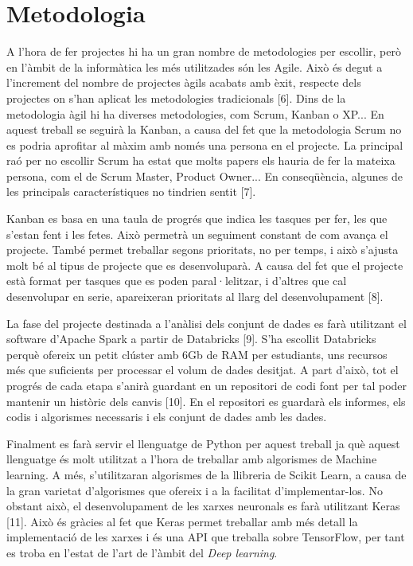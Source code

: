 \documentclass[10pt,a4paper,twocolumn,twoside]{article}
\begin{document}
\section {Metodologia}
A l'hora de fer projectes hi ha un gran nombre de metodologies per escollir, però en l'àmbit de la informàtica les més utilitzades són les Agile. Això és degut a l'increment del nombre de projectes àgils acabats amb èxit, respecte dels projectes on s'han aplicat les metodologies tradicionals [6]. Dins de la metodologia àgil hi ha diverses metodologies, com Scrum, Kanban o XP... En aquest treball se seguirà la Kanban, a causa del fet que la metodologia Scrum no es podria aprofitar al màxim amb només una persona en el projecte. La principal raó per no escollir Scrum ha estat que molts papers els hauria de fer la mateixa persona, com el de Scrum Master, Product Owner... En conseqüència, algunes de les principals característiques no tindrien sentit [7].

Kanban es basa en una taula de progrés que indica les tasques per fer, les que s'estan fent i les fetes. Això permetrà un seguiment constant de com avança el projecte. També permet treballar segons prioritats, no per temps, i això s'ajusta molt bé al tipus de projecte que es desenvoluparà. A causa del fet que el projecte està format per tasques que es poden paral·lelitzar, i d'altres que cal desenvolupar en serie, apareixeran prioritats al llarg del desenvolupament [8].

La fase del projecte destinada a l'anàlisi dels conjunt de dades es farà utilitzant el software d'Apache Spark a partir de Databricks [9]. S'ha escollit Databricks perquè ofereix un petit clúster amb 6Gb de RAM per estudiants, uns recursos més que suficients per processar el volum de dades desitjat.
A part d'això, tot el progrés de cada etapa s'anirà guardant en un repositori de codi font per tal poder mantenir un històric dels canvis [10]. En el repositori es guardarà els informes, els codis i algorismes necessaris i els conjunt de dades amb les dades.

Finalment es farà servir el llenguatge de Python per aquest treball ja què aquest llenguatge és molt utilitzat a l'hora de treballar amb algorismes de Machine learning. A més, s'utilitzaran algorismes de la llibreria de Scikit Learn, a causa de la gran varietat d'algorismes que ofereix i a la facilitat d'implementar-los. No obstant això, el desenvolupament de les xarxes neuronals es farà utilitzant Keras [11]. Això és gràcies al fet que Keras permet treballar amb més detall la implementació de les xarxes i és una API que treballa sobre TensorFlow, per tant es troba en l'estat de l'art de l'àmbit del \textit{Deep learning}.
\end{document}
